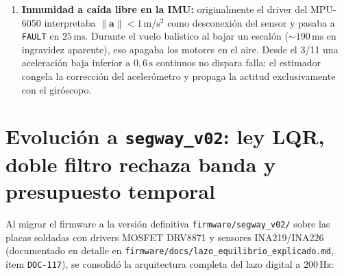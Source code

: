 \documentclass[11pt,a4paper]{report}
\newcommand{\ud}[1]{\,\mathrm{#1}}
\begin{document}
\begin{enumerate}[leftmargin=1.6em]
      diferencia. Con \texttt{xlibre = 1}, durante el movimiento el LQR regula únicamente la
      velocidad (la referencia $x_{\text{ref}}$ acompaña al robot) más un término anticipado
      $u_{\text{ff}} = \texttt{ff}\cdot v_{\text{ref}}$, y recién fija la posición final cuando
      la rampa de frenado termina y $|v|$ cae a cero.
\item \textbf{Inmunidad a caída libre en la IMU:} originalmente el driver del MPU-6050
      interpretaba $\|\boldsymbol{a}\| < 1\ud{m/s^2}$ como desconexión del sensor y pasaba a
      \texttt{FAULT} en $25\ud{ms}$. Durante el vuelo balístico al bajar un escalón ($\sim 190\ud{ms}$
      en ingravidez aparente), eso apagaba los motores en el aire. Desde el 3/11 una aceleración
      baja inferior a $0{,}6\ud{s}$ continuos no dispara falla: el estimador congela la
      corrección del acelerómetro y propaga la actitud exclusivamente con el giróscopo.
\end{enumerate}

\section{Evolución a \texttt{segway\_v02}: ley LQR, doble filtro rechaza banda y presupuesto temporal}\label{sec:v02_lazo}

Al migrar el firmware a la versión definitiva \texttt{firmware/segway\_v02/} sobre las placas
soldadas con drivers MOSFET DRV8871 y sensores INA219/INA226 (documentado en detalle en
\texttt{firmware/docs/lazo\_equilibrio\_explicado.md}, ítem \texttt{DOC-117}), se consolidó la
arquitectura completa del lazo digital a $200\ud{Hz}$:
\end{document}
